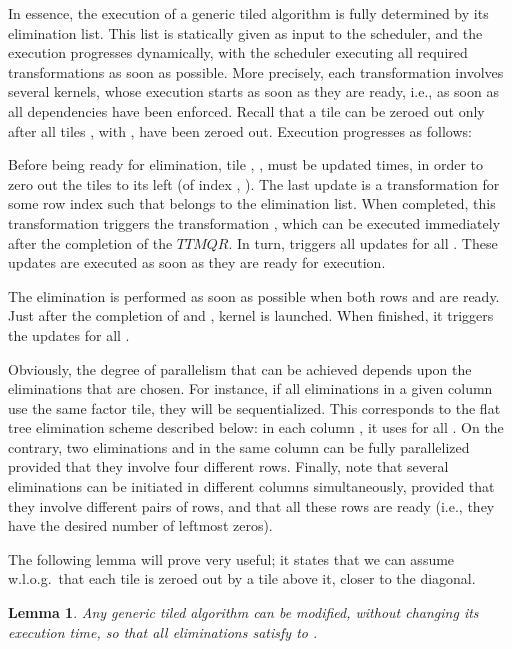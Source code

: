 \documentclass[a4paper,twopages]{article}
\newtheorem{lemma}{Lemma}
\newcommand{\TTMQR}{\ensuremath{\mathit{TTMQR}}\xspace}
\begin{document}
In essence, the execution of a generic tiled algorithm is fully determined by
its elimination list.  This list is statically given as input to the scheduler,
and the execution progresses dynamically, with the scheduler executing all
required transformations as soon as possible.  More precisely, each
transformation involves several kernels, whose execution starts as soon as they
are ready, i.e., as soon as all dependencies have been enforced.
Recall that a tile  can be zeroed out only after all tiles , with
, have been zeroed out. Execution progresses as follows:
\begin{compactitem}
\item Before being ready for elimination, tile , , must be updated
     times, in order to zero out the  tiles to its left (of index
    , ). The last update is a transformation  for some row index  such that 
    belongs to the elimination list. When completed, this transformation
    triggers the transformation , which can be executed
    immediately after the completion of the \TTMQR. In turn, 
    triggers all updates  for all .  These updates
    are executed as soon as they are ready for execution.

\item The elimination  is performed as soon as possible
    when both rows  and  are ready. Just after the completion of \linebreak
     and , kernel
      is launched. When finished, it
    triggers the updates  for all .
\end{compactitem}

Obviously, the degree of parallelism that can be achieved depends upon the
eliminations that are chosen.  For instance, if all eliminations in a given
column use the same factor tile, they will be sequentialized.  This corresponds
to the flat tree elimination scheme described below: in each column , it
uses  for all . On the contrary, two eliminations
  and  in the same column can
be fully parallelized provided that they involve four different rows. Finally,
note that several eliminations can be initiated in different columns
simultaneously, provided that they involve different pairs of rows, and that
all these rows are ready (i.e., they have the desired number of leftmost
zeros).

The following lemma will prove very useful; it states that we can assume
w.l.o.g.\ that each tile is zeroed out by a tile above it, closer to the
diagonal.

\begin{lemma}
\label{th.above}
Any generic tiled algorithm can be modified, without changing its
execution time, so that all eliminations  satisfy to .
\end{lemma}
\end{document}

